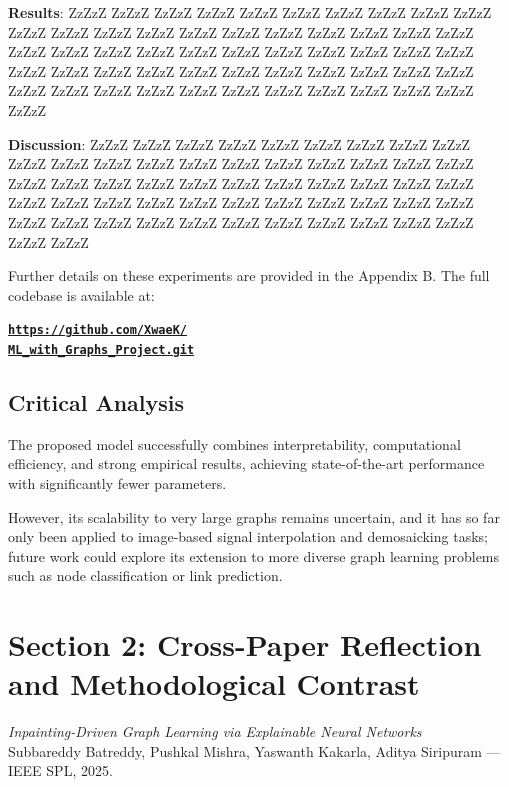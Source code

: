 \documentclass{article}
\theoremstyle{plain}
\theoremstyle{definition}
\theoremstyle{remark}
\begin{document}
\textbf{Results}: ZzZzZ ZzZzZ ZzZzZ ZzZzZ ZzZzZ ZzZzZ ZzZzZ ZzZzZ ZzZzZ ZzZzZ ZzZzZ ZzZzZ ZzZzZ ZzZzZ ZzZzZ ZzZzZ ZzZzZ ZzZzZ ZzZzZ ZzZzZ ZzZzZ ZzZzZ ZzZzZ ZzZzZ ZzZzZ ZzZzZ ZzZzZ ZzZzZ ZzZzZ ZzZzZ ZzZzZ ZzZzZ ZzZzZ ZzZzZ ZzZzZ ZzZzZ ZzZzZ ZzZzZ ZzZzZ ZzZzZ ZzZzZ ZzZzZ ZzZzZ ZzZzZ ZzZzZ ZzZzZ ZzZzZ ZzZzZ ZzZzZ ZzZzZ ZzZzZ ZzZzZ ZzZzZ ZzZzZ ZzZzZ

\textbf{Discussion}: ZzZzZ ZzZzZ ZzZzZ ZzZzZ ZzZzZ ZzZzZ ZzZzZ ZzZzZ ZzZzZ ZzZzZ ZzZzZ ZzZzZ ZzZzZ ZzZzZ ZzZzZ ZzZzZ ZzZzZ ZzZzZ ZzZzZ ZzZzZ ZzZzZ ZzZzZ ZzZzZ ZzZzZ ZzZzZ ZzZzZ ZzZzZ ZzZzZ ZzZzZ ZzZzZ ZzZzZ ZzZzZ ZzZzZ ZzZzZ ZzZzZ ZzZzZ ZzZzZ ZzZzZ ZzZzZ ZzZzZ ZzZzZ ZzZzZ ZzZzZ ZzZzZ ZzZzZ ZzZzZ ZzZzZ ZzZzZ ZzZzZ ZzZzZ ZzZzZ ZzZzZ ZzZzZ ZzZzZ ZzZzZ

Further details on these experiments are provided in the Appendix B. The full codebase is available at:
\begin{center}
\vskip -0.1in
\href{https://github.com/XwaeK/ML_with_Graphs_Project.git}{\textbf{\texttt{https://github.com/XwaeK/\\ML\_with\_Graphs\_Project.git}}}
\vskip -0.1in
\end{center}

\subsection{Critical Analysis}

The proposed model successfully combines interpretability, computational efficiency, and strong empirical results, achieving state-of-the-art performance with significantly fewer parameters.

However, its scalability to very large graphs remains uncertain, and it has so far only been applied to image-based signal interpolation and demosaicking tasks; future work could explore its extension to more diverse graph learning problems such as node classification or link prediction.




\setcounter{section}{2}
\setcounter{subsection}{0}
\section*{Section 2: Cross-Paper Reflection and Methodological Contrast}

\textit{Inpainting-Driven Graph Learning via Explainable Neural Networks} \\
Subbareddy Batreddy, Pushkal Mishra, Yaswanth Kakarla, Aditya Siripuram — IEEE SPL, 2025.
\end{document}
